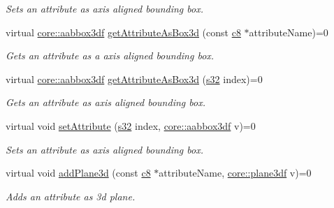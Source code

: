 \begin{DoxyCompactItemize}
\begin{DoxyCompactList}\small\item\em Sets an attribute as axis aligned bounding box. \end{DoxyCompactList}\item 
virtual \hyperlink{namespaceirr_1_1core_a60f4b4c744aba55f10530d503c6ecb04}{core\+::aabbox3df} \hyperlink{classirr_1_1io_1_1IAttributes_a215218b9b1ebb8313557b44bb3bce363}{get\+Attribute\+As\+Box3d} (const \hyperlink{namespaceirr_a9395eaea339bcb546b319e9c96bf7410}{c8} $\ast$attribute\+Name)=0
\begin{DoxyCompactList}\small\item\em Gets an attribute as a axis aligned bounding box. \end{DoxyCompactList}\item 
virtual \hyperlink{namespaceirr_1_1core_a60f4b4c744aba55f10530d503c6ecb04}{core\+::aabbox3df} \hyperlink{classirr_1_1io_1_1IAttributes_a3da2aafbf1bfe8bcdb7dfa2866a4efe4}{get\+Attribute\+As\+Box3d} (\hyperlink{namespaceirr_ac66849b7a6ed16e30ebede579f9b47c6}{s32} index)=0
\begin{DoxyCompactList}\small\item\em Gets an attribute as axis aligned bounding box. \end{DoxyCompactList}\item 
\mbox{\label{classirr_1_1io_1_1IAttributes_a5384d725e45fa4b8916ecbf64d07b3be}} 
virtual void \hyperlink{classirr_1_1io_1_1IAttributes_a5384d725e45fa4b8916ecbf64d07b3be}{set\+Attribute} (\hyperlink{namespaceirr_ac66849b7a6ed16e30ebede579f9b47c6}{s32} index, \hyperlink{namespaceirr_1_1core_a60f4b4c744aba55f10530d503c6ecb04}{core\+::aabbox3df} v)=0
\begin{DoxyCompactList}\small\item\em Sets an attribute as axis aligned bounding box. \end{DoxyCompactList}\item 
\mbox{\label{classirr_1_1io_1_1IAttributes_a567d22135378c1da552f480e0ca90d43}} 
virtual void \hyperlink{classirr_1_1io_1_1IAttributes_a567d22135378c1da552f480e0ca90d43}{add\+Plane3d} (const \hyperlink{namespaceirr_a9395eaea339bcb546b319e9c96bf7410}{c8} $\ast$attribute\+Name, \hyperlink{namespaceirr_1_1core_a97c9b39d4c6f71dbd9ded0153c4fa7f7}{core\+::plane3df} v)=0
\begin{DoxyCompactList}\small\item\em Adds an attribute as 3d plane. \end{DoxyCompactList}\item 

\end{DoxyCompactItemize}
